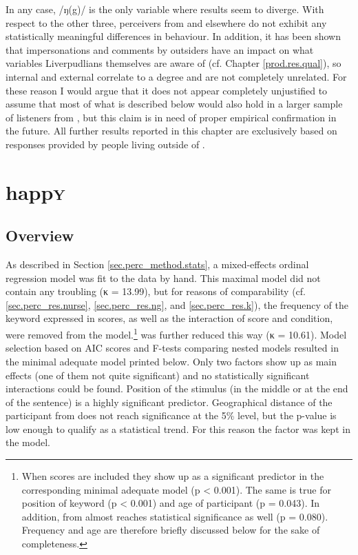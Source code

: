 In any case, /ŋ(g)/ is the only variable where results seem to diverge.
With respect to the other three, perceivers from  and elsewhere do not exhibit any statistically meaningful differences in behaviour.
In addition, it has been shown that impersonations and comments by outsiders have an impact on what variables Liverpudlians themselves are  aware of (cf. Chapter \ref{prod.res.qual}), so internal and external  correlate to a degree and are not completely unrelated.
For these reason I would argue that it does not appear completely unjustified to assume that most of what is described below would also hold in a larger sample of listeners from , but this claim is in need of proper empirical confirmation in the future.
All further results reported in this chapter are exclusively based on responses provided by people living outside of .

\section{happ\textrm{\textsc{y}}}
\label{sec.perc_res.happy}
	\subsection{Overview}
	\label{sec.perc_res.happy.overview}

As described in Section \ref{sec.perc_method.stats}, a mixed-effects ordinal regression model was fit to the data by hand.
This maximal model did not contain any troubling  (κ = 13.99), but for reasons of comparability (cf. \ref{sec.perc_res.nurse}, \ref{sec.perc_res.ng}, and \ref{sec.perc_res.k}), the frequency of the keyword expressed in  scores, as well as the interaction of  score and  condition, were removed from the model.\footnote{When  scores are included they show up as a significant predictor in the corresponding minimal adequate model (p < 0.001). The same is true for position of keyword (p < 0.001) and age of participant (p = 0.043). In addition,  from  almost reaches statistical significance as well (p = 0.080). Frequency and age are therefore briefly discussed below for the sake of completeness.}
 was further reduced this way (κ = 10.61).
Model selection based on AIC scores and F-tests comparing nested models resulted in the minimal adequate model printed below.
Only two factors show up as main effects (one of them not quite significant) and no statistically significant interactions could be found.
Position of the stimulus (in the middle or at the end of the sentence) is a highly significant predictor.
Geographical distance of the participant from  does not reach significance at the 5\% level, but the p-value is low enough to qualify as a statistical trend.
For this reason the factor was kept in the model.

